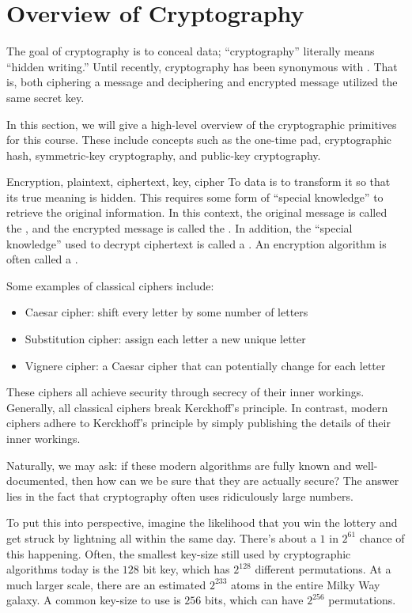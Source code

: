 \section{Overview of Cryptography}
The goal of cryptography is to conceal data; ``cryptography'' literally means ``hidden writing.'' Until recently, cryptography has been synonymous with . That is, both ciphering a message and deciphering and encrypted message utilized the same secret key.

In this section, we will give a high-level overview of the cryptographic primitives for this course. These include concepts such as the one-time pad, cryptographic hash, symmetric-key cryptography, and public-key cryptography.

\begin{dfnbox}{Encryption, plaintext, ciphertext, key, cipher}{}
    To  data is to transform it so that its true meaning is hidden. This requires some form of ``special knowledge'' to retrieve the original information. In this context, the original message is called the , and the encrypted message is called the . In addition, the ``special knowledge'' used to decrypt ciphertext is called a . An encryption algorithm is often called a .
\end{dfnbox}

Some examples of classical ciphers include:
\begin{itemize}
    \item Caesar cipher: shift every letter by some number of letters
    \item Substitution cipher: assign each letter a new unique letter
    \item Vignere cipher: a Caesar cipher that can potentially change for each letter
\end{itemize}

These ciphers all achieve security through secrecy of their inner workings. Generally, all classical ciphers break Kerckhoff's principle. In contrast, modern ciphers adhere to Kerckhoff's principle by simply publishing the details of their inner workings.

Naturally, we may ask: if these modern algorithms are fully known and well-documented, then how can we be sure that they are actually secure? The answer lies in the fact that cryptography often uses ridiculously large numbers.

To put this into perspective, imagine the likelihood that you win the lottery and get struck by lightning all within the same day. There's about a $1$ in $2^{61}$ chance of this happening. Often, the smallest key-size still used by cryptographic algorithms today is the $128$ bit key, which has $2^{128}$ different permutations. At a much larger scale, there are an estimated $2^{233}$ atoms in the entire Milky Way galaxy. A common key-size to use is $256$ bits, which can have $2^{256}$ permutations.

